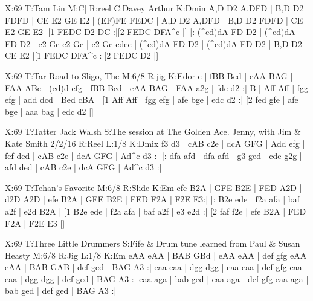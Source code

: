 \documentclass{article}
\begin{document}
\begin{abc}[name]
X:69
T:Tam Lin
M:C|
R:reel
C:Davey Arthur
K:Dmin
A,D D2 A,DFD | B,D D2 FDFD | CE E2 GE E2 | (EF)FE FEDC |
A,D D2 A,DFD | B,D D2 FDFD | CE E2 GE E2 |[1 FEDC D2 DC :|[2 FEDC DFA^c |]
|: (^cd)dA FD D2 | (^cd)dA FD D2 | c2 Gc c2 Gc | c2 Gc cdec |
(^cd)dA FD D2 | (^cd)dA FD D2 | B,D D2 CE E2 |[1 FEDC DFA^c :|[2 FEDC D2 |]
\end{abc}

\begin{abc}[name]
X:69
T:Tar Road to Sligo, The
M:6/8
R:jig
K:Edor
e | fBB Bcd | eAA BAG | FAA ABc | (cd)d efg |
fBB Bcd | eAA BAG | FAA a2g | fdc d2 :|
B | Aff Aff | fgg efg | add dcd | Bed cBA |
[1 Aff Aff | fgg efg | afe bge | edc d2 :|
[2 fed gfe | afe bge | aaa bag | edc d2 |]
\end{abc}

\begin{abc}[name]
X:69
T:Tatter Jack Walsh
S:The session at The Golden Ace. Jenny, with Jim & Kate Smith  2/2/16
R:Reel
L:1/8
K:Dmix
f3 d3 | cAB c2e | dcA GFG | Add efg |
fef ded | cAB c2e | dcA GFG | Ad^c d3 :|
|: dfa afd | dfa afd | g3 ged | cde g2g |
afd ded | cAB c2e | dcA GFG | Ad^c d3 :|
\end{abc}

\begin{abc}[name]
X:69
T:Tehan's Favorite
M:6/8
R:Slide
K:Em
efe B2A | GFE B2E | FED A2D | d2D A2D |
efe B2A | GFE B2E | FED F2A | F2E E3:|
|: B2e ede | f2a afa | baf a2f | e2d B2A |
[1 B2e ede | f2a afa | baf a2f | e3 e2d :|
[2 faf f2e | efe B2A | FED F2A | F2E E3 |]
\end{abc}

\begin{abc}[name]
X:69
T:Three Little Drummers
S:Fife & Drum tune learned from Paul & Susan Heasty
M:6/8
R:Jig
L:1/8
K:Em
eAA eAA | BAB GBd | eAA eAA | def gfg
eAA eAA | BAB GAB | def ged | BAG A3 :|
eaa eaa | dgg dgg | eaa eaa | def gfg
eaa eaa | dgg dgg | def ged | BAG A3 :|
eaa aga | bab ged | eaa aga | def gfg
eaa aga | bab ged | def ged | BAG A3 :|
\end{abc}
\end{document}
